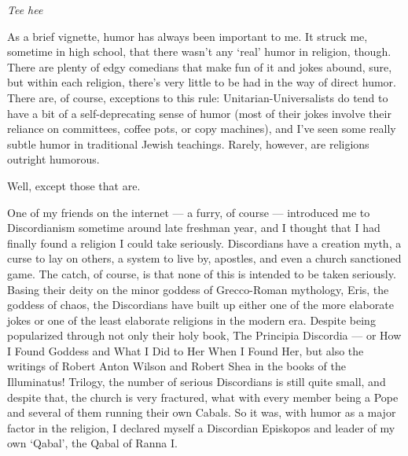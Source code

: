 \emph{Tee hee}

As a brief vignette, humor has always been important to me. It struck me, sometime in high school, that there wasn't any `real' humor in religion, though. There are plenty of edgy comedians that make fun of it and jokes abound, sure, but within each religion, there's very little to be had in the way of direct humor. There are, of course, exceptions to this rule: Unitarian-Universalists do tend to have a bit of a self-deprecating sense of humor (most of their jokes involve their reliance on committees, coffee pots, or copy machines), and I've seen some really subtle humor in traditional Jewish teachings. Rarely, however, are religions outright humorous.

Well, except those that are.

One of my friends on the internet --- a furry, of course --- introduced me to Discordianism sometime around late freshman year, and I thought that I had finally found a religion I could take seriously. Discordians have a creation myth, a curse to lay on others, a system to live by, apostles, and even a church sanctioned game. The catch, of course, is that none of this is intended to be taken seriously. Basing their deity on the minor goddess of Grecco-Roman mythology, Eris, the goddess of chaos, the Discordians have built up either one of the more elaborate jokes or one of the least elaborate religions in the modern era. Despite being popularized through not only their holy book, The Principia Discordia --- or How I Found Goddess and What I Did to Her When I Found Her, but also the writings of Robert Anton Wilson and Robert Shea in the books of the Illuminatus! Trilogy, the number of serious Discordians is still quite small, and despite that, the church is very fractured, what with every member being a Pope and several of them running their own Cabals. So it was, with humor as a major factor in the religion, I declared myself a Discordian Episkopos and leader of my own `Qabal', the Qabal of Ranna I.

